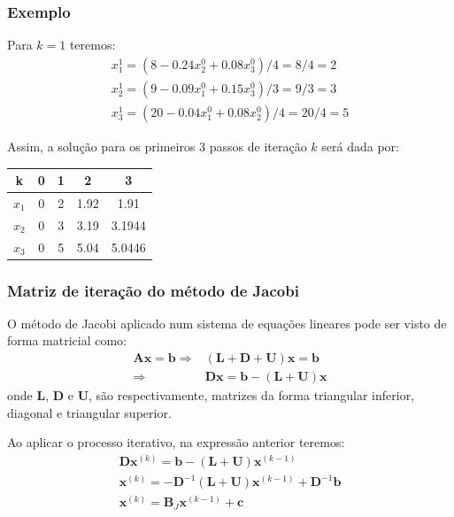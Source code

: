 \documentclass{beamer}
\theoremstyle{mystyle}
\begin{document}
\begin{frame}
	\frametitle{Exemplo}
	Para $ k=1 $ teremos:
	\begin{gather*}
		x_1^{1} = ( 8 - 0.24 x_2^{0} + 0.08 x_3^{0} ) / 4 = 8/4 = 2\\
		x_2^{1} = ( 9 - 0.09 x_1^{0} + 0.15 x_3^{0} ) / 3 = 9/3 = 3\\
		x_3^{1} = ( 20 - 0.04 x_1^{0} + 0.08 x_2^{0} ) / 4 = 20/4 = 5
	\end{gather*}

	Assim, a solução para os primeiros 3 passos de iteração $ k $ será dada por:
	\begin{table}
		\centering
		\begin{tabular}{c|c|c|c|c}
			k & 0 & 1 & 2 & 3 \\
			\hline
			\hline
			$ x_1 $ & 0 & 2 & 1.92 & 1.91 \\
			$ x_2 $ & 0 & 3 & 3.19 & 3.1944 \\
			$ x_3 $ & 0	& 5 & 5.04 & 5.0446 
		\end{tabular}
	\end{table}
\end{frame}

\begin{frame}
	\frametitle{Matriz de iteração do método de Jacobi}
	O método de Jacobi aplicado num sistema de equações lineares pode ser visto de forma matricial como:
	\begin{align*}
		\mathbf{A}\mathbf{x} = \mathbf{b} \Rightarrow&  \left( \mathbf{L} + \mathbf{D} + \mathbf{U}\right) \mathbf{x} = \mathbf{b} \\
		\Rightarrow&  \mathbf{D}\mathbf{x} = \mathbf{b} - \left( \mathbf{L} + \mathbf{U}\right) \mathbf{x}
	\end{align*}
	onde \textbf{L}, \textbf{D} e \textbf{U}, são respectivamente, matrizes da forma triangular inferior, diagonal e triangular superior.
	
	Ao aplicar o processo iterativo, na expressão anterior teremos:
	\begin{gather*}
		\mathbf{D}\mathbf{x}^{(k)} = \mathbf{b} - \left( \mathbf{L} + \mathbf{U}\right) \mathbf{x}^{(k-1)}\\
		\mathbf{x}^{(k)} = - \mathbf{D}^{-1} \left( \mathbf{L} + \mathbf{U}\right) \mathbf{x}^{(k-1)}  + \mathbf{D}^{-1} \mathbf{b}\\
		\mathbf{x}^{(k)} =  \mathbf{B}_{J} \mathbf{x}^{(k-1)} + \mathbf{c}  \\
	\end{gather*}
\end{frame}
\end{document}
